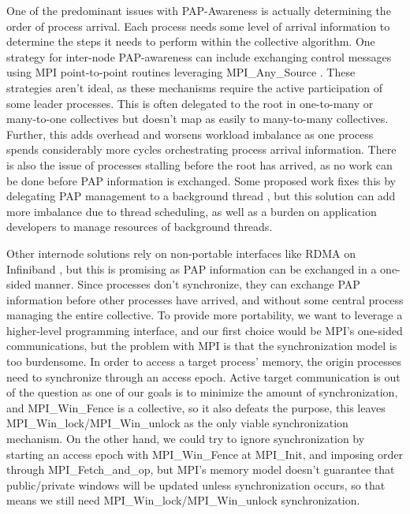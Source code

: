 One of the predominant issues with PAP-Awareness is actually determining the order of process arrival.
Each process needs some level of arrival information to determine the steps it needs to perform within the collective algorithm. 
One strategy for inter-node PAP-awareness can include exchanging control messages using MPI point-to-point routines leveraging MPI\_Any\_Source \cite{Patarasuk2008EffBcastDifProcArr}.
These strategies aren't ideal, as these mechanisms require the active participation of some leader processes.
This is often delegated to the root in one-to-many or many-to-one collectives but doesn't map as easily to many-to-many collectives.
Further, this adds overhead and worsens workload imbalance as one process spends considerably more cycles orchestrating process arrival information.
There is also the issue of processes stalling before the root has arrived, as no work can be done before PAP information is exchanged.
Some proposed work fixes this by delegating PAP management to a background thread \cite{Proficz2018ImprvAllReduceForImbPAP, Proficz2020PAPAwareScatterGather, Proficz2021AllGatherResilientToImbPAP, Faraj2008StudyProcArrivalMPIColl}, but this solution can add more imbalance due to thread scheduling, as well as a burden on application developers to manage resources of background threads.

Other internode solutions rely on non-portable interfaces like RDMA on Infiniband \cite{Qian2009ProcArrivalSHMA2AIB}, but this is promising as PAP information can be exchanged in a one-sided manner.
Since processes don't synchronize, they can exchange PAP information before other processes have arrived, and without some central process managing the entire collective. 
To provide more portability, we want to leverage a higher-level programming interface, and our first choice would be MPI's one-sided communications, but the problem with MPI is that the synchronization model is too burdensome. 
In order to access a target process' memory, the origin processes need to synchronize through an access epoch. 
Active target communication is out of the question as one of our goals is to minimize the amount of synchronization, and MPI\_Win\_Fence is a collective, so it also defeats the purpose, this leaves  MPI\_Win\_lock/MPI\_Win\_unlock as the only viable synchronization mechanism.
On the other hand, we could try to ignore synchronization by starting an access epoch with MPI\_Win\_Fence at MPI\_Init, and imposing order through MPI\_Fetch\_and\_op, but MPI's memory model doesn't guarantee that public/private windows will be updated unless synchronization occurs, so that means we still need MPI\_Win\_lock/MPI\_Win\_unlock synchronization.

